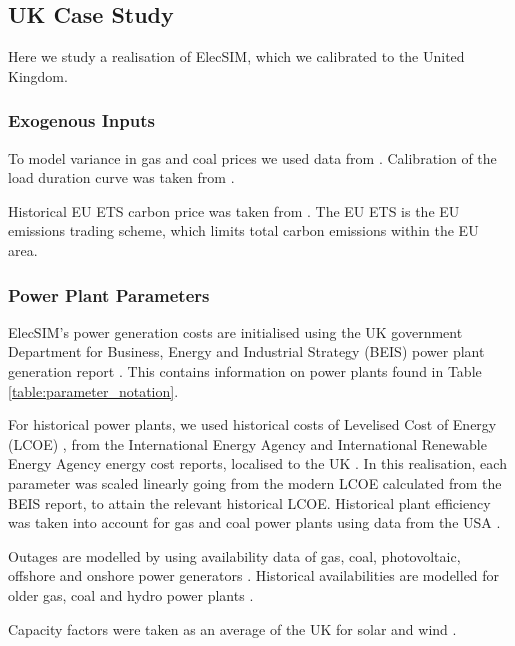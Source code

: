 {\color{blue}
\subsection{UK Case Study}

Here we study a realisation of ElecSIM, which we calibrated to the United Kingdom.

\subsubsection{Exogenous Inputs}

To model variance in gas and coal prices we used data from \cite{coalprices,gasprices}. Calibration of the load duration curve was taken from \cite{gbnationalgridstatus_2019}.

Historical EU ETS carbon price was taken from \cite{jones_moore_macdonald_macdonald_buckley_macdonald_2019}. The EU ETS is the EU emissions trading scheme, which limits total carbon emissions within the EU area.

\subsubsection{Power Plant Parameters}

ElecSIM's power generation costs are initialised using the UK government Department for Business, Energy and Industrial Strategy (BEIS) power plant generation report \cite{Department2016}. This contains information on power plants found in Table \ref{table:parameter_notation}.

For historical power plants, we used historical costs of Levelised Cost of Energy (LCOE) \cite{Dale2013}, from the International Energy Agency and International Renewable Energy Agency energy cost reports, localised to the UK \cite{IEA2015,IRENA2018}. In this realisation, each parameter was scaled linearly going from the modern LCOE calculated from the BEIS report, to attain the relevant historical LCOE. Historical plant efficiency was taken into account for gas and coal power plants using data from the USA \cite{EIA2013}.

Outages are modelled by using availability data of gas, coal, photovoltaic, offshore and onshore power generators \cite{Ltd2016, Hunt2015, carroll-j}. Historical availabilities are modelled for older gas, coal and hydro power plants \cite{AlbertaSystemElectricOperator2016}.

Capacity factors were taken as an average of the UK for solar and wind \cite{Pfenninger2016, Staffell2016}.






}
